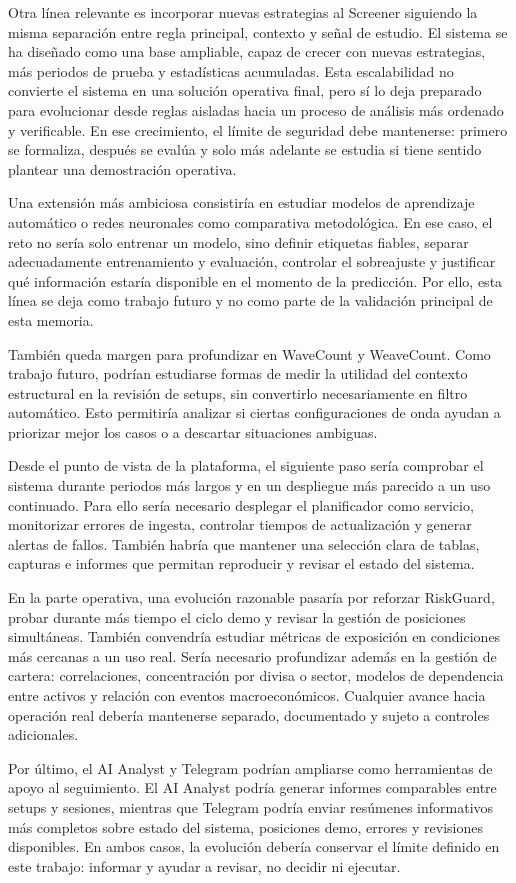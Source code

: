 Otra l\'inea relevante es incorporar nuevas estrategias al Screener siguiendo la
misma separaci\'on entre regla principal, contexto y se\~nal de estudio. El
sistema se ha dise\~nado como una base ampliable, capaz de crecer con nuevas
estrategias, m\'as periodos de prueba y estad\'isticas acumuladas. Esta
escalabilidad no convierte el sistema en una soluci\'on operativa final, pero s\'i
lo deja preparado para evolucionar desde reglas aisladas hacia un proceso de
an\'alisis m\'as ordenado y verificable. En ese crecimiento, el l\'imite de
seguridad debe mantenerse: primero se formaliza, despu\'es se eval\'ua y solo m\'as
adelante se estudia si tiene sentido plantear una demostraci\'on operativa.

Una extensi\'on m\'as ambiciosa consistir\'ia en estudiar modelos de aprendizaje
autom\'atico o redes neuronales como comparativa metodol\'ogica. En ese caso, el
reto no ser\'ia solo entrenar un modelo, sino definir etiquetas fiables, separar
adecuadamente entrenamiento y evaluaci\'on, controlar el sobreajuste y justificar
qu\'e informaci\'on estar\'ia disponible en el momento de la predicci\'on. Por ello,
esta l\'inea se deja como trabajo futuro y no como parte de la validaci\'on
principal de esta memoria.

Tambi\'en queda margen para profundizar en WaveCount y WeaveCount. Como trabajo
futuro, podr\'ian estudiarse formas de medir la utilidad del contexto estructural
en la revisi\'on de setups, sin convertirlo necesariamente en filtro autom\'atico.
Esto permitir\'ia analizar si ciertas configuraciones de onda ayudan a priorizar
mejor los casos o a descartar situaciones ambiguas.

Desde el punto de vista de la plataforma, el siguiente paso ser\'ia comprobar el
sistema durante periodos m\'as largos y en un despliegue m\'as parecido a un uso
continuado. Para ello ser\'ia necesario desplegar el planificador como servicio,
monitorizar errores de ingesta, controlar tiempos de actualizaci\'on y generar alertas
de fallos. Tambi\'en habr\'ia que mantener una selecci\'on clara de tablas, capturas
e informes que permitan reproducir y revisar el estado del sistema.

En la parte operativa, una evoluci\'on razonable pasar\'ia por reforzar RiskGuard,
probar durante m\'as tiempo el ciclo demo y revisar la gesti\'on de posiciones
simult\'aneas. Tambi\'en convendr\'ia estudiar m\'etricas de exposici\'on en condiciones m\'as cercanas a
un uso real. Ser\'ia necesario profundizar adem\'as en la gesti\'on de cartera:
correlaciones, concentraci\'on por divisa o sector, modelos de dependencia entre
activos y relaci\'on con eventos macroecon\'omicos. Cualquier avance hacia
operaci\'on real deber\'ia mantenerse separado, documentado y sujeto a controles
adicionales.

Por \'ultimo, el AI Analyst y Telegram podr\'ian ampliarse como herramientas de
apoyo al seguimiento. El AI Analyst podr\'ia generar informes comparables entre
setups y sesiones, mientras que Telegram podr\'ia enviar res\'umenes informativos
m\'as completos sobre estado del sistema, posiciones demo, errores y revisiones
disponibles. En ambos casos, la evoluci\'on deber\'ia conservar el l\'imite
definido en este trabajo: informar y ayudar a revisar, no decidir ni ejecutar.
